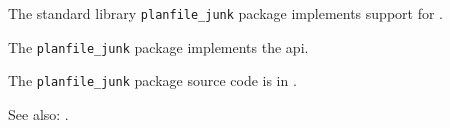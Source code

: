 
The standard library {\tt planfile\_junk} package implements support for  .

The {\tt planfile\_junk} package implements the  api.

The {\tt planfile\_junk} package source code is in .

See also:  .


